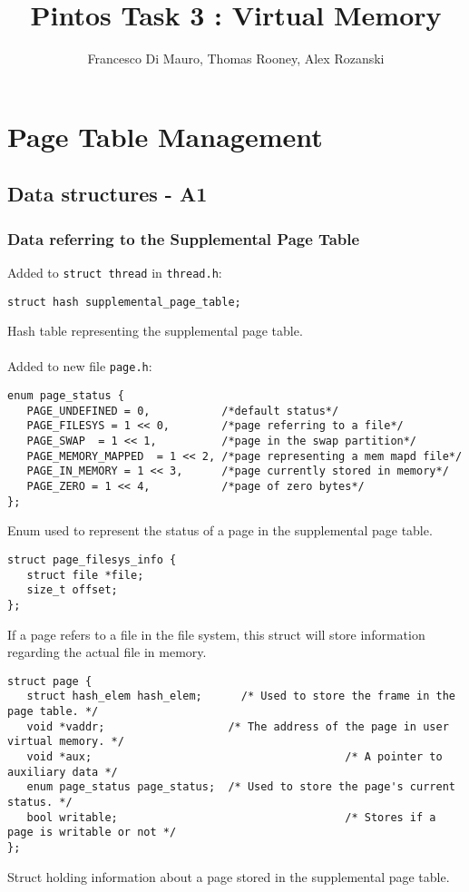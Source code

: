 \documentclass[a4wide, 11pt]{article}
\newcommand{\tx}{\texttt}
\begin{document}
\title{Pintos Task 3 : Virtual Memory}
\author{Francesco Di Mauro, Thomas Rooney, Alex Rozanski}

\maketitle

\section{Page Table Management}
\subsection{Data structures - A1}
\subsubsection{Data referring to the Supplemental Page Table}

Added to \tx{struct thread} in \tx{thread.h}:
\begin{verbatim}
struct hash supplemental_page_table;
\end{verbatim}
Hash table representing the supplemental page table. \\\\
Added to new file \tx{page.h}:
\begin{verbatim}
enum page_status {
   PAGE_UNDEFINED = 0,           /*default status*/
   PAGE_FILESYS = 1 << 0,        /*page referring to a file*/
   PAGE_SWAP  = 1 << 1,          /*page in the swap partition*/
   PAGE_MEMORY_MAPPED  = 1 << 2, /*page representing a mem mapd file*/
   PAGE_IN_MEMORY = 1 << 3,      /*page currently stored in memory*/
   PAGE_ZERO = 1 << 4,           /*page of zero bytes*/
};
\end{verbatim}
Enum used to represent the status of a page in the supplemental page table.

\begin{verbatim}
struct page_filesys_info {
   struct file *file;
   size_t offset;
};
\end{verbatim}
If a page refers to a file in the file system, this struct will store information regarding the actual file in memory.


\begin{verbatim}
struct page {
   struct hash_elem hash_elem;   	/* Used to store the frame in the page table. */
   void *vaddr;                   /* The address of the page in user virtual memory. */
   void *aux;	               					    /* A pointer to auxiliary data */
   enum page_status page_status;  /* Used to store the page's current status. */
   bool writable;					                /* Stores if a page is writable or not */
};
\end{verbatim}
Struct holding information about a page stored in the supplemental page table.
\end{document}
